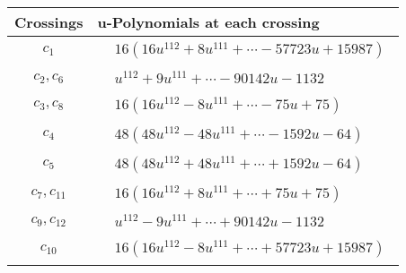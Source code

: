 \documentclass[1p]{elsarticle_modified}
\theoremstyle{definition}
\begin{document}
\begin{tabular}{m{50pt}|m{274pt}}
Crossings & \hspace{64pt}u-Polynomials at each crossing \\
\hline $$\begin{aligned}c_{1}\end{aligned}$$&$\begin{aligned}
&16(16 u^{112}+8 u^{111}+\cdots-57723 u+15987)
\end{aligned}$\\
\hline $$\begin{aligned}c_{2},c_{6}\end{aligned}$$&$\begin{aligned}
&u^{112}+9 u^{111}+\cdots-90142 u-1132
\end{aligned}$\\
\hline $$\begin{aligned}c_{3},c_{8}\end{aligned}$$&$\begin{aligned}
&16(16 u^{112}-8 u^{111}+\cdots-75 u+75)
\end{aligned}$\\
\hline $$\begin{aligned}c_{4}\end{aligned}$$&$\begin{aligned}
&48(48 u^{112}-48 u^{111}+\cdots-1592 u-64)
\end{aligned}$\\
\hline $$\begin{aligned}c_{5}\end{aligned}$$&$\begin{aligned}
&48(48 u^{112}+48 u^{111}+\cdots+1592 u-64)
\end{aligned}$\\
\hline $$\begin{aligned}c_{7},c_{11}\end{aligned}$$&$\begin{aligned}
&16(16 u^{112}+8 u^{111}+\cdots+75 u+75)
\end{aligned}$\\
\hline $$\begin{aligned}c_{9},c_{12}\end{aligned}$$&$\begin{aligned}
&u^{112}-9 u^{111}+\cdots+90142 u-1132
\end{aligned}$\\
\hline $$\begin{aligned}c_{10}\end{aligned}$$&$\begin{aligned}
&16(16 u^{112}-8 u^{111}+\cdots+57723 u+15987)
\end{aligned}$\\
\hline
\end{tabular}\\~\\
\end{document}

